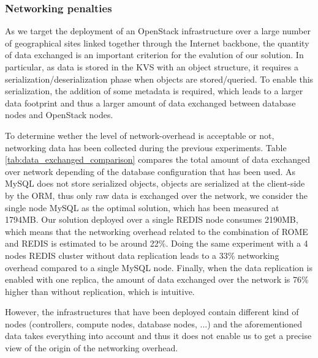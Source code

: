 
\subsubsection{Networking penalties}

As we target the deployment of an OpenStack infrastructure over a large number of geographical sites linked together through the Internet backbone,
the quantity of data exchanged is an important criterion for the evalution of our solution. In particular, as data is stored in the KVS with an object
structure, it requires a serialization/deserialization phase when objects are stored/queried.  To enable this serialization, the addition of some
metadata is required, which leads to a larger data footprint and thus a larger amount of data exchanged between database nodes and OpenStack nodes.

To determine wether the level of network-overhead is acceptable or not,
networking data has been collected during the previous experiments. Table
\ref{tab:data_exchanged_comparison} compares the total amount of data exchanged
over network depending of the database configuration that has been used. As
MySQL does not store serialized objects, \ie objects are serialized at the
client-side by the ORM, thus only raw data is exchanged over the network, we
consider the single node MySQL as the optimal solution, which has been measured
at 1794MB. Our solution deployed over a single REDIS node consumes 2190MB, which
means that the networking overhead related to the combination of ROME and REDIS
is estimated to be around 22\%. Doing the same experiment with a 4 nodes REDIS
cluster without data replication leads to a 33\% networking overhead compared to
a single MySQL node. Finally, when the data replication is enabled with one
replica, the amount of data exchanged over the network is 76\% higher than
without replication, which is intuitive.

However, the infrastructures that have been deployed contain
different kind of nodes (controllers, compute nodes, database nodes, ...) and
the aforementioned data takes everything into account and thus it does not
enable us to get a precise view of the origin of the networking overhead.

